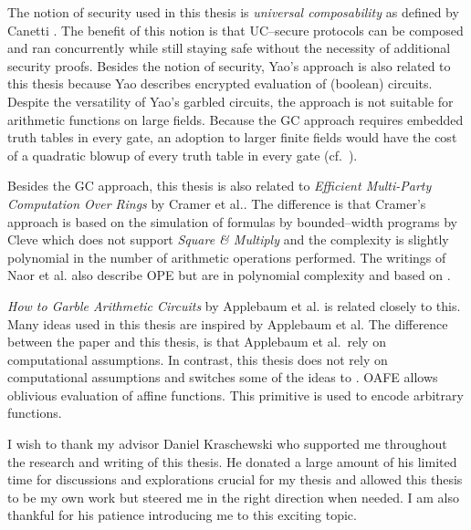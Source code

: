 %
%
\label{sec:related-work}

The notion of security used in this thesis is \emph{universal composability} as
defined by Canetti \cite{canetti05}. The benefit of this notion is that
UC--secure protocols can be composed and ran concurrently while still staying
safe without the necessity of additional security proofs. Besides the notion of
security, Yao's  approach \cite{yao86} is also
related to this thesis because Yao describes encrypted evaluation of (boolean)
circuits.  Despite the versatility of Yao's garbled circuits, the approach is
not suitable for arithmetic functions on large fields. Because the GC approach
requires embedded truth tables in every gate, an adoption to larger finite
fields would have the cost of a quadratic blowup of every truth table in every
gate (cf.\ \cite{naor99privacy}).

Besides the GC approach, this thesis is also related to \emph{Efficient
Multi-Party Computation Over Rings} by Cramer et al.\cite{cramer03}. The
difference is that Cramer's approach is based on the simulation of formulas by
bounded--width programs by Cleve \cite{cleve91} which does not support
\emph{Square \& Multiply} \cite{knuth81} and the complexity is slightly
polynomial in the number of arithmetic operations performed. The writings of
Naor et al.\cite{naor99,naor06} also describe OPE but are in polynomial
complexity and based on  \cite{rabin81}.

\emph{How to Garble Arithmetic Circuits} by Applebaum et al.\cite{gac2012} is
related closely to this. Many ideas used in this thesis are inspired by
Applebaum et al. The difference between the paper and this thesis, is that
Applebaum et al.\ rely on computational assumptions. In contrast, this thesis
does not rely on computational assumptions and switches some of the ideas to
 \cite{davidgoliath}. OAFE
allows oblivious evaluation of affine functions. This primitive is used to
encode arbitrary functions.


%
%

I wish to thank my advisor Daniel Kraschewski who supported me throughout the
research and writing of this thesis. He donated a large amount of his limited
time for discussions and explorations crucial for my thesis and allowed this
thesis to be my own work but steered me in the right direction when needed.  I
am also thankful for his patience introducing me to this exciting topic.


